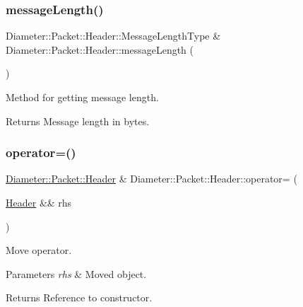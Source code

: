 \subsubsection{\texorpdfstring{message\+Length()}{messageLength()}\hspace{0.1cm}{\footnotesize\ttfamily [2/2]}}
{\footnotesize\ttfamily Diameter\+::\+Packet\+::\+Header\+::\+Message\+Length\+Type \& Diameter\+::\+Packet\+::\+Header\+::message\+Length (\begin{DoxyParamCaption}{ }\end{DoxyParamCaption})}



Method for getting message length. 

\begin{DoxyReturn}{Returns}
Message length in bytes. 
\end{DoxyReturn}
\mbox{\label{classDiameter_1_1Packet_1_1Header_ae863a0e3740a82b3418494cfa15f4530}} 
\subsubsection{\texorpdfstring{operator=()}{operator=()}\hspace{0.1cm}{\footnotesize\ttfamily [1/2]}}
{\footnotesize\ttfamily \hyperlink{classDiameter_1_1Packet_1_1Header}{Diameter\+::\+Packet\+::\+Header} \& Diameter\+::\+Packet\+::\+Header\+::operator= (\begin{DoxyParamCaption}\item[{\hyperlink{classDiameter_1_1Packet_1_1Header}{Header} \&\&}]{rhs }\end{DoxyParamCaption})\hspace{0.3cm}{\ttfamily [noexcept]}}



Move operator. 


\begin{DoxyParams}{Parameters}
{\em rhs} & Moved object. \\
\hline
\end{DoxyParams}
\begin{DoxyReturn}{Returns}
Reference to constructor. 
\end{DoxyReturn}
\mbox{\label{classDiameter_1_1Packet_1_1Header_a20db71c8a57453bcd9cbdbf796bf84b1}} 
